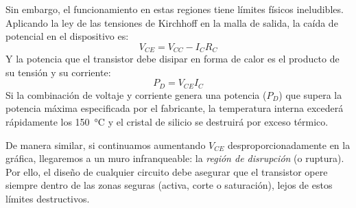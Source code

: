 Sin embargo, el funcionamiento en estas regiones tiene límites físicos ineludibles. Aplicando la ley de las tensiones de Kirchhoff en la malla de salida, la caída de potencial en el dispositivo es:
\[
V_{CE} = V_{CC} - I_C R_C
\]
Y la potencia que el transistor debe disipar en forma de calor es el producto de su tensión y su corriente:
\[
P_D = V_{CE} I_C
\]
Si la combinación de voltaje y corriente genera una potencia (\(P_D\)) que supera la potencia máxima especificada por el fabricante, la temperatura interna excederá rápidamente los \qty{150}{\degreeCelsius} y el cristal de silicio se destruirá por exceso térmico. 

De manera similar, si continuamos aumentando \(V_{CE}\) desproporcionadamente en la gráfica, llegaremos a un muro infranqueable: la \textit{región de disrupción} (o ruptura). Por ello, el diseño de cualquier circuito debe asegurar que el transistor opere siempre dentro de las zonas seguras (activa, corte o saturación), lejos de estos límites destructivos.



